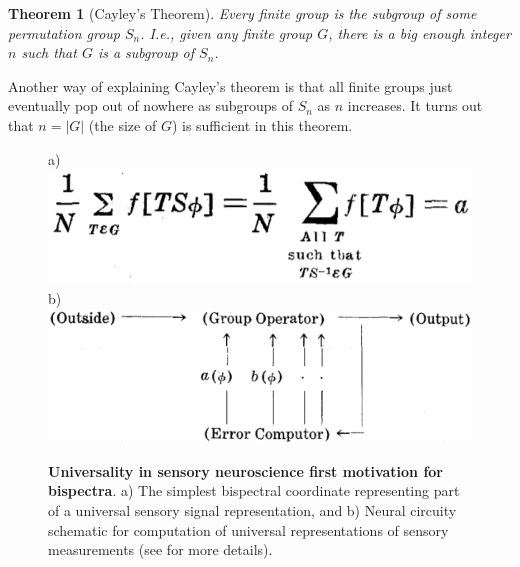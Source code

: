 \documentclass[letterpaper, 10pt]{article}
\newtheorem{theorem}{Theorem}[section]
\theoremstyle{definition}
\begin{document}
\begin{theorem}[Cayley's Theorem]
Every finite group is the subgroup of some permutation group $S_n$.  I.e., given any finite group $G$, there is a big enough integer $n$ such that $G$ is a subgroup of $S_n$.  
\end{theorem}
Another way of explaining Cayley's theorem is that all finite groups just eventually pop out of nowhere as subgroups of $S_n$ as $n$ increases.
It turns out that $n = |G|$ (the size of $G$) is sufficient in this theorem. 

\begin{figure}[t!]
 \begin{center}
a)  \includegraphics[width=.45 \linewidth]{figs/pitts_1947_first_bispect_coeff.png}  
b) \includegraphics[width=.45 \linewidth]{figs/pitts_1947_diagram.png}   
\caption{\textbf{Universality in sensory neuroscience first motivation for bispectra}. a) The simplest bispectral coordinate representing part of a universal sensory signal representation, and b) Neural circuity schematic for computation of universal representations of sensory measurements (see \cite{pitts1947} for more details).}
\label{pitts_bispectra}
\end{center}
\end{figure}
\end{document}
